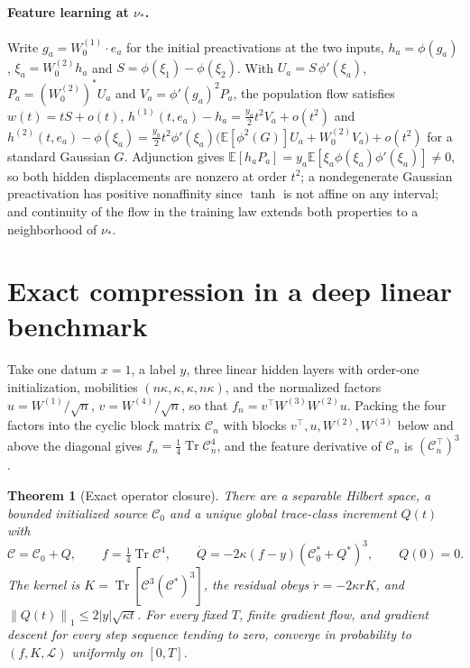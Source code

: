 \documentclass[11pt]{article}
\newtheorem{theorem}{Theorem}[section]
\theoremstyle{definition}
\theoremstyle{remark}
\newcommand{\E}{\mathbb{E}}
\newcommand{\cL}{\mathcal{L}}
\newcommand{\norm}[1]{\left\lVert #1\right\rVert}
\begin{document}
\paragraph{Feature learning at $\nu_*$.}
Write $g_a=W^{(1)}_0\cdot e_a$ for the initial preactivations at the two inputs,
$h_a=\phi(g_a)$, $\xi_a=W^{(2)}_0h_a$ and
$S=\phi(\xi_1)-\phi(\xi_2)$.  With $U_a=S\,\phi'(\xi_a)$,
$P_a=(W^{(2)}_0)^*U_a$ and $V_a=\phi'(g_a)^2P_a$, the population flow satisfies
$w(t)=tS+o(t)$, $h^{(1)}(t,e_a)-h_a=\tfrac{y_a}2t^2V_a+o(t^2)$ and
$h^{(2)}(t,e_a)-\phi(\xi_a)=\tfrac{y_a}2t^2\phi'(\xi_a)\bigl(\E[\phi^2(G)]U_a+W^{(2)}_0V_a\bigr)+o(t^2)$
for a standard Gaussian $G$.  Adjunction gives
$\E[h_aP_a]=y_a\E[\xi_a\phi(\xi_a)\phi'(\xi_a)]\ne0$, so both hidden displacements
are nonzero at order $t^2$; a nondegenerate Gaussian preactivation has positive
nonaffinity since $\tanh$ is not affine on any interval; and continuity of the
flow in the training law extends both properties to a neighborhood of $\nu_*$.

\section{Exact compression in a deep linear benchmark}
\label{app:exact}

Take one datum $x=1$, a label $y$, three linear hidden layers with order-one
initialization, mobilities $(n\kappa,\kappa,\kappa,n\kappa)$, and the normalized
factors $u=W^{(1)}/\sqrt n$, $v=W^{(4)}/\sqrt n$, so that
$f_n=v^\top W^{(3)}W^{(2)}u$.  Packing the four factors into the cyclic block
matrix $\mathcal C_n$ with blocks $v^\top,u,W^{(2)},W^{(3)}$ below and above the
diagonal gives $f_n=\tfrac14\operatorname{Tr}\mathcal C_n^4$, and the feature
derivative of $\mathcal C_n$ is $(\mathcal C_n^\top)^3$.

\begin{theorem}[Exact operator closure]
\label{thm:operator}
There are a separable Hilbert space, a bounded initialized source $\mathcal C_0$
and a unique global trace-class increment $Q(t)$ with
\[
 \mathcal C=\mathcal C_0+Q,\qquad f=\tfrac14\operatorname{Tr}\mathcal C^4,\qquad
 \dot Q=-2\kappa(f-y)(\mathcal C_0^*+Q^*)^3,\qquad Q(0)=0 .
\]
The kernel is $K=\operatorname{Tr}[\mathcal C^3(\mathcal C^*)^3]$, the residual
obeys $\dot r=-2\kappa rK$, and $\norm{Q(t)}_1\le2|y|\sqrt{\kappa t}$.  For every
fixed $T$, finite gradient flow, and gradient descent for every step sequence
tending to zero, converge in probability to $(f,K,\cL)$ uniformly on $[0,T]$.
\end{theorem}
\end{document}
